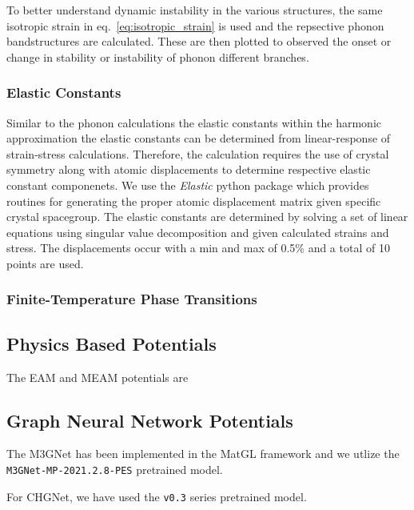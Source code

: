 \documentclass[preprint]{elsarticle}
\begin{document}
To better understand dynamic instability in the various structures, the same isotropic strain in eq.~\ref{eq:isotropic_strain} is used and the repsective phonon bandstructures are calculated. These are then plotted to observed the onset or change in stability or instability of phonon different branches. \par

\subsubsection{Elastic Constants}

Similar to the phonon calculations the elastic constants within the harmonic approximation the elastic constants can be determined from linear-response of strain-stress calculations. Therefore, the calculation requires the use of crystal symmetry along with atomic displacements to determine respective elastic constant componenets. We use the \textit{Elastic}\cite{Jochym2018} python package which provides routines for generating the proper atomic displacement matrix given specific crystal spacegroup. The elastic constants are determined by solving a set of linear equations using singular value decomposition and given calculated strains and stress. The displacements occur with a min and max of 0.5\% and a total of 10 points are used. \par

\subsubsection{Finite-Temperature Phase Transitions}

\subsection{Physics Based Potentials}
\label{sec:physics_potentials}

The EAM and MEAM potentials are 


\subsection{Graph Neural Network Potentials}

The M3GNet has been implemented in the MatGL framework and we utlize the \texttt{M3GNet-MP-2021.2.8-PES} pretrained model.

For CHGNet, we have used the \texttt{v0.3} series pretrained model.

\end{document}
